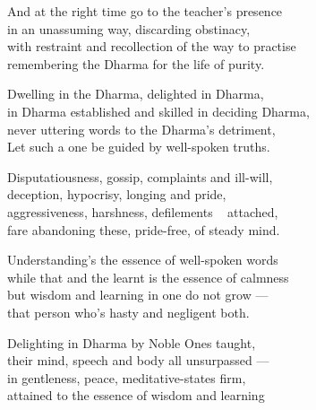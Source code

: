 \begin{MyDescription}{}
And at the right time go to the teacher's presence\\
in an unassuming way, discarding obstinacy,\\
with restraint and recollection of the way to practise\\
remembering the Dharma for the life of purity.
\end{MyDescription}

\begin{MyDescription}{}
Dwelling in the Dharma, delighted in Dharma,\\
in Dharma established and skilled in deciding Dharma,\\
never uttering words to the Dharma's detriment,\\
Let such a one be guided by well-spoken truths.
\end{MyDescription}

\begin{MyDescription}{}
Disputatiousness, gossip, complaints and ill-will,\\
deception, hypocrisy, longing and pride,\\
aggressiveness, harshness, deﬁlements ~ attached,\\
fare abandoning these, pride-free, of steady mind.
\end{MyDescription}

\begin{MyDescription}{}
Understanding's the essence of well-spoken words\\
while that and the learnt is the essence of calmness\\
but wisdom and learning in one do not grow —\\
that person who's hasty and negligent both.
\end{MyDescription}

\begin{MyDescription}{}
Delighting in Dharma by Noble Ones taught,\\
their mind, speech and body all unsurpassed —\\
in gentleness, peace, meditative-states firm,\\
attained to the essence of wisdom and learning
\end{MyDescription}
  
